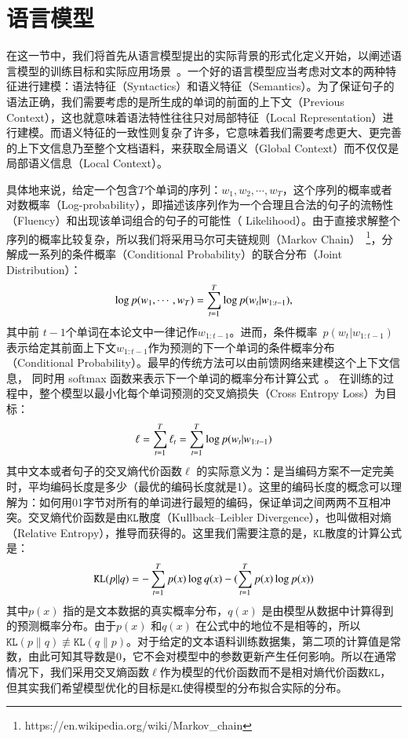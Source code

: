 \section{语言模型}
在这一节中，我们将首先从语言模型提出的实际背景的形式化定义开始，以阐述语言模型的训练目标和实际应用场景~。一个好的语言模型应当考虑对文本的两种特征进行建模：语法特征（Syntactics）和语义特征（Semantics）。为了保证句子的语法正确，我们需要考虑的是所生成的单词的前面的上下文（Previous Context），这也就意味着语法特性往往只对局部特征（Local Representation）进行建模。而语义特征的一致性则复杂了许多，它意味着我们需要考虑更大、更完善的上下文信息乃至整个文档语料，来获取全局语义（Global Context）而不仅仅是局部语义信息（Local Context）。


具体地来说，给定一个包含$T$个单词的序列：$w_1,w_2,\cdots,w_T$，这个序列的概率或者对数概率（Log-probability），即描述该序列作为一个合理且合法的句子的流畅性（Fluency）和出现该单词组合的句子的可能性（ Likelihood）。由于直接求解整个序列的概率比较复杂，所以我们将采用马尔可夫链规则（Markov Chain）~\footnote{https://en.wikipedia.org/wiki/Markov\_chain}，分解成一系列的条件概率（Conditional Probability）的联合分布（Joint Distribution）：
\begin{equation}
\setlength{\abovedisplayskip}{6pt}
\setlength{\belowdisplayskip}{6pt}
\label{laguage_model}
 \log p(w_1,\cdots, w_T ) = \sum_{t=1}^T \log p(w_t | w_{1:t-1}),
\end{equation}
其中前 $t-1$个单词在本论文中一律记作$w_ {1:t-1}$。进而，条件概率~$p(w_t | w_ {1:t-1})$表示给定其前面上下文$w_ {1:t-1} $作为预测的下一个单词的条件概率分布（Conditional Probability）。最早的传统方法可以由前馈网络来建模这个上下文信息， 同时用 softmax 函数来表示下一个单词的概率分布计算公式~。 在训练的过程中，整个模型以最小化每个单词预测的交叉熵损失（Cross Entropy Loss）为目标：
\begin{equation}\label{equ:losses2}
\setlength{\abovedisplayskip}{6pt}
\setlength{\belowdisplayskip}{6pt}
  \ell=\sum_{t=1}^{T}\ell_t=\sum_{t=1}^{T}\log p(w_t | w_{1:t-1})
\end{equation}
其中文本或者句子的交叉熵代价函数$\ell$ 的实际意义为：是当编码方案不一定完美时，平均编码长度是多少（最优的编码长度就是1）。这里的编码长度的概念可以理解为：如何用01字节对所有的单词进行最短的编码，保证单词之间两两不互相冲突。交叉熵代价函数是由$\texttt{KL}$散度（Kullback–Leibler Divergence），也叫做相对熵（Relative Entropy），推导而获得的。这里我们需要注意的是，$\mathtt{KL}$散度的计算公式是：
\begin{equation}\label{equ:losses}
\setlength{\abovedisplayskip}{6pt}
\setlength{\belowdisplayskip}{6pt}
  \mathtt{KL}(p||q)=-\sum_{t=1}^{T}p(x)\log q(x) - (\sum_{t=1}^{T}p(x)\log p(x))
\end{equation}
其中$p(x)$ 指的是文本数据的真实概率分布，$q(x)$ 是由模型从数据中计算得到的预测概率分布。由于$p(x)$ 和$q(x)$ 在公式中的地位不是相等的，所以$\texttt{KL} (p\parallel q)\not\equiv \texttt{KL}(q\parallel p)$。对于给定的文本语料训练数据集，第二项的计算值是常数，由此可知其导数是0，它不会对模型中的参数更新产生任何影响。所以在通常情况下，我们采用交叉熵函数$\ell$作为模型的代价函数而不是相对熵代价函数$\mathtt{KL}$，但其实我们希望模型优化的目标是$\mathtt{KL}$使得模型的分布拟合实际的分布。
